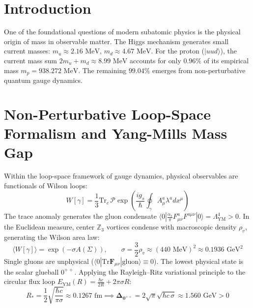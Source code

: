 \documentclass[11pt,a4paper]{article}
\begin{document}
\section{Introduction}
One of the foundational questions of modern subatomic physics is the physical origin of mass in observable matter. The Higgs mechanism generates small current masses: $m_u \approx 2.16\text{ MeV}$, $m_d \approx 4.67\text{ MeV}$. For the proton ($|uud\rangle$), the current mass sum $2m_u + m_d \approx 8.99\text{ MeV}$ accounts for only $0.96\%$ of its empirical mass $m_p = 938.272\text{ MeV}$. The remaining $99.04\%$ emerges from non-perturbative quantum gauge dynamics.

\section{Non-Perturbative Loop-Space Formalism and Yang-Mills Mass Gap}
Within the loop-space framework of gauge dynamics, physical observables are functionals of Wilson loops:
\begin{equation}
W[\gamma] = \frac{1}{3} \mathrm{Tr}_c \, \mathcal{P} \exp \left( \frac{ig_s}{\hbar} \oint_\gamma A_\mu^a \lambda^a dx^\mu \right)
\end{equation}
The trace anomaly generates the gluon condensate $\langle 0 | \frac{\alpha_s}{\pi} F_{\mu\nu}^a F^{a\mu\nu} | 0 \rangle = \Lambda_{\mathrm{YM}}^4 > 0$. In the Euclidean measure, center $\mathbb{Z}_3$ vortices condense with macroscopic density $\rho_v$, generating the Wilson area law:
\begin{equation}
\langle W[\gamma] \rangle = \exp(-\sigma A(\Sigma)), \qquad \sigma = \frac{3}{2}\rho_v \approx (440\text{ MeV})^2 \approx 0.1936\text{ GeV}^2
\end{equation}
Single gluons are unphysical ($\langle 0 | \mathrm{Tr}\mathbf{F}_{\mu\nu} | \text{gluon} \rangle \equiv 0$). The lowest physical state is the scalar glueball $0^{++}$. Applying the Rayleigh--Ritz variational principle to the circular flux loop $E_{\mathrm{YM}}(R) = \frac{\hbar c}{2R} + 2\pi\sigma R$:
\begin{equation}
R_* = \frac{1}{2}\sqrt{\frac{\hbar c}{\pi\sigma}} \approx 0.1267\text{ fm} \implies \mathbf{\Delta_{0^{++}}} = 2\sqrt{\pi}\sqrt{\hbar c \, \sigma} \approx 1.560\text{ GeV} > 0
\end{equation}
\end{document}
